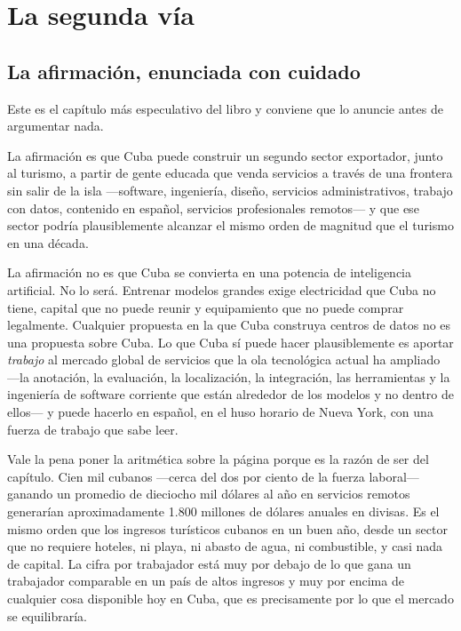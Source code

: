 \chapter{La segunda vía}
\label{ch:talent}

\section{La afirmación, enunciada con cuidado}

Este es el capítulo más especulativo del libro y conviene que lo anuncie antes de
argumentar nada.

La afirmación es que Cuba puede construir un segundo sector exportador, junto al turismo,
a partir de gente educada que venda servicios a través de una frontera sin salir de la
isla ---software, ingeniería, diseño, servicios administrativos, trabajo con datos,
contenido en español, servicios profesionales remotos--- y que ese sector podría
plausiblemente alcanzar el mismo orden de magnitud que el turismo en una década.

La afirmación no es que Cuba se convierta en una potencia de inteligencia artificial. No
lo será. Entrenar modelos grandes exige electricidad que Cuba no tiene, capital que no
puede reunir y equipamiento que no puede comprar legalmente. Cualquier propuesta en la que
Cuba construya centros de datos no es una propuesta sobre Cuba. Lo que Cuba sí puede hacer
plausiblemente es aportar \emph{trabajo} al mercado global de servicios que la ola
tecnológica actual ha ampliado ---la anotación, la evaluación, la localización, la
integración, las herramientas y la ingeniería de software corriente que están alrededor de
los modelos y no dentro de ellos--- y puede hacerlo en español, en el huso horario de Nueva
York, con una fuerza de trabajo que sabe leer.

Vale la pena poner la aritmética sobre la página porque es la razón de ser del capítulo.
Cien mil cubanos ---cerca del dos por ciento de la fuerza laboral--- ganando un promedio de
dieciocho mil dólares al año en servicios remotos generarían aproximadamente 1.800 millones
de dólares anuales en divisas.\unv{} Es el mismo orden que los ingresos turísticos cubanos
en un buen año, desde un sector que no requiere hoteles, ni playa, ni abasto de agua, ni
combustible, y casi nada de capital. La cifra por trabajador está muy por debajo de lo que
gana un trabajador comparable en un país de altos ingresos y muy por encima de cualquier
cosa disponible hoy en Cuba, que es precisamente por lo que el mercado se equilibraría.

